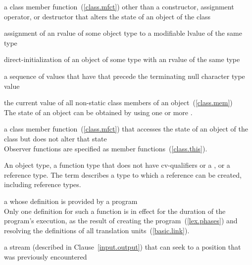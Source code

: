 %
a class member function~(\ref{class.mfct}) other than a constructor,
assignment operator, or destructor
that alters the state of an object of the class

%
assignment of an rvalue of some object type to a modifiable lvalue of the same type

%
direct-initialization of an object of some type with an rvalue of the same type

%
%
a sequence of values that have
that precede the terminating null character type
value

%
the current value of all non-static class members of an object~(\ref{class.mem})\\
\enternote
The state of an object can be obtained by using one or more
.
\exitnote

%
a class member function~(\ref{class.mfct}) that accesses the state of an object of the class 
but does not alter that state\\
\enternote
Observer functions are specified as
member functions~(\ref{class.this}).
\exitnote

An object type, a function type that does not have cv-qualifiers or a
, or a reference type.
\enternote The term describes a type to which a reference can be created,
including reference types. \exitnote

%
a
whose definition is provided by a \Cpp program\\
\enternote
Only one definition for such a function is in effect for the duration of the program's
execution, as the result of creating the program~(\ref{lex.phases}) and resolving the
definitions of all translation units~(\ref{basic.link}).
\exitnote

%
a stream (described in Clause~\ref{input.output}) that can seek to a position that was
previously encountered

